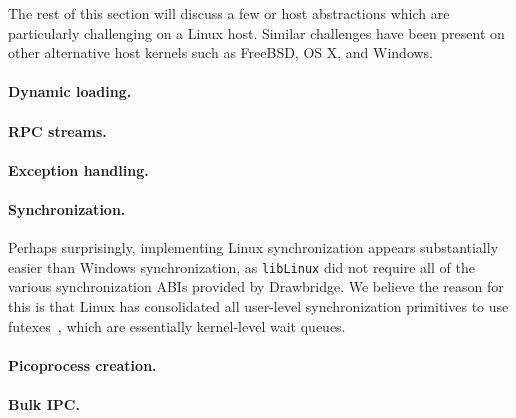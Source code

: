 

The rest of this section
will discuss a few \hostapis{} or host abstractions which are particularly challenging on a Linux host.
Similar challenges have been present %
on other alternative host kernels such as FreeBSD, OS X, and Windows.


\paragraph{Dynamic loading.}


\paragraph{RPC streams.}


\paragraph{Exception handling.}


\paragraph{Synchronization.} Perhaps surprisingly, implementing Linux
synchronization appears substantially easier than Windows synchronization, 
as {\tt libLinux} did not require all of the various
synchronization ABIs provided by Drawbridge.
We believe the reason for this is that Linux has consolidated 
all user-level synchronization primitives to use futexes~\cite{franke02futex},
which are essentially kernel-level wait queues.


\paragraph{Picoprocess creation.}



\paragraph{Bulk IPC.}


